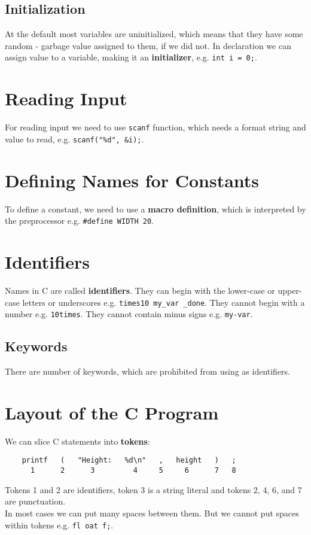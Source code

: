 \documentclass[openany]{book}
\begin{document}
    \subsection*{Initialization}
    At the default most variables are uninitialized, which means that they have some
    random - garbage value assigned to them, if we did not. In declaration we can assign
    value to a variable, making it an \textbf{initializer}, e.g. \texttt{int i = 0;}.

    \section{Reading Input}
    For reading input we need to use \texttt{scanf} function, which needs a format
    string and value to read, e.g. \texttt{scanf("\%d", \&i);}.

    \section{Defining Names for Constants}
    To define a constant, we need to use a \textbf{macro definition}, which is
    interpreted by the preprocessor e.g. \texttt{\#define WIDTH 20}.

    \section{Identifiers}
    Names in C are called \textbf{identifiers}. They can begin with the lower-case or
    upper-case letters or underscores e.g. \texttt{times10  my\_var  \_done}. They
    cannot begin with a number e.g. \texttt{10times}. They cannot contain minus signs
    e.g. \texttt{my-var}.

    \subsection*{Keywords}
    There are number of keywords, which are prohibited from using as identifiers.

    \section{Layout of the C Program}
    We can slice C statements into \textbf{tokens}:
    \begin{lstlisting}
    printf   (   "Height:   %d\n"   ,   height   )   ;
      1      2      3         4     5     6      7   8
    \end{lstlisting}
    Tokens 1 and 2 are identifiers, token 3 is a string literal and tokens 2, 4, 6,
     and 7 are punctuation. \\
    In most cases we can put many spaces between them. But we cannot put spaces within
    tokens e.g. \texttt{fl oat f;}. 
\end{document}
